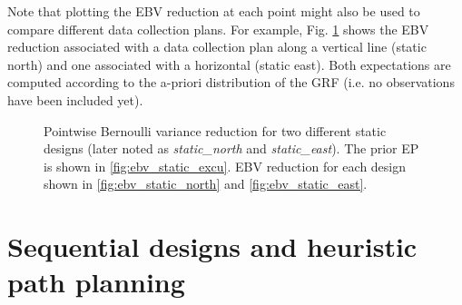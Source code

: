 \documentclass[aoas,preprint]{imsart}
\begin{document}
Note that plotting the EBV reduction at each point might also be used
to compare different data collection plans. For example,
Fig. \ref{fig:ebv_north_vs_east} shows the EBV reduction associated
with a data collection plan along a vertical line (static north) and
one associated with a horizontal (static east). Both expectations are
computed according to the a-priori distribution of the GRF (i.e. no
observations have been included yet).


\begin{figure}[ht] 
\centering 
{}
\caption{Pointwise Bernoulli variance reduction for two different static designs (later noted as \textit{static\_north} and \textit{static\_east}). The prior EP is shown in
  \ref{fig:ebv_static_excu}. EBV reduction for each design shown in
  \ref{fig:ebv_static_north} and \ref{fig:ebv_static_east}.}
\label{fig:ebv_north_vs_east}
\end{figure}


\section{Sequential designs and heuristic path planning}
\label{sec:heuristics}
\end{document}
